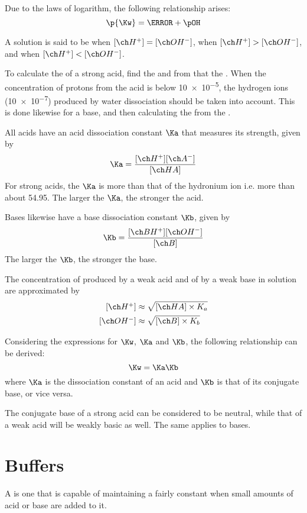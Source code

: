 \documentclass[Chemistry.tex]{subfiles}
\begin{document}
Due to the laws of logarithm, the following relationship arises: \begin{equation}\p{\Kw} = \pH + \pOH\end{equation}

A solution is said to be  when \(\conc{H^+} = \conc{OH^-}\),  when \(\conc{H^+} > \conc{OH^-}\), and  when \(\conc{H^+} < \conc{OH^-}\).

To calculate the \pH{} of a strong acid, find the  and from that the \pH{}. When the concentration of protons from the acid is below \SI{10e-5}{\molar}, the hydrogen ions (\SI{10e-7}{\molar}) produced by water dissociation should be taken into account. This is done likewise for a base, and then calculating the \pH{} from the \pOH{}.

All acids have an acid dissociation constant \(\Ka\) that measures its strength, given by \begin{equation}\Ka = \frac{\conc{H^+}\conc{A^-}}{\conc{HA}}\end{equation} For strong acids, the \(\Ka\) is more than that of the hydronium ion i.e. more than about \num{54.95}. The larger the \(\Ka\), the stronger the acid.

Bases likewise have a base dissociation constant \(\Kb\), given by \begin{equation}\Kb = \frac{\conc{BH^+}\conc{OH^-}}{\conc{B}}\end{equation} The larger the \(\Kb\), the stronger the base.

The concentration of  produced by a weak acid and of  by a weak base in solution are approximated by \begin{align}\conc{H^+} &\approx \sqrt{\conc{HA} \times K_{a}}\\\conc{OH^-} &\approx \sqrt{\conc{B} \times K_{b}}\end{align}

Considering the expressions for \(\Kw\), \(\Ka\) and \(\Kb\), the following relationship can be derived: \begin{equation}\Kw = \Ka\Kb\end{equation} where \(\Ka\) is the dissociation constant of an acid and \(\Kb\) is that of its conjugate base, or vice versa.

The conjugate base of a strong acid can be considered to be neutral, while that of a weak acid will be weakly basic as well. The same applies to bases.
\section{Buffers}
A  is one that is capable of maintaining a fairly constant \pH{} when small amounts of acid or base are added to it.
\end{document}
